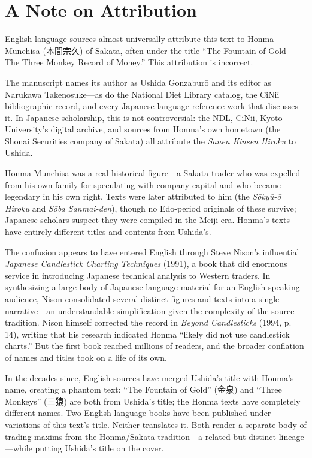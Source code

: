 \documentclass[10pt, openany]{book}
\newcommand{\jp}[1]{{\japanesefont #1}}
\begin{document}
\section*{A Note on Attribution}

English-language sources almost universally attribute this text to Honma
Munehisa (\jp{本間宗久}) of Sakata, often under the title ``The Fountain
of Gold---The Three Monkey Record of Money.'' This attribution is
incorrect.

The manuscript names its author as Ushida Gonzabur\=o and its editor as
Narukawa Takenosuke---as do the National Diet Library catalog, the CiNii
bibliographic record, and every Japanese-language reference work that
discusses it. In Japanese scholarship, this is not controversial:
the NDL, CiNii, Kyoto University's digital archive, and sources from
Honma's own hometown (the Shonai Securities company of Sakata) all
attribute the \textit{Sanen Kinsen Hiroku} to Ushida.

Honma Munehisa was a real historical figure---a Sakata trader who was
expelled from his own family for speculating with company capital and who
became legendary in his own right. Texts were later attributed to him
(the \textit{S\=oky\=u-\=o Hiroku} and \textit{S\=oba Sanmai-den}),
though no Edo-period originals of these survive; Japanese scholars suspect
they were compiled in the Meiji era. Honma's texts have entirely different
titles and contents from Ushida's.

The confusion appears to have entered English through Steve Nison's
influential \textit{Japanese Candlestick Charting Techniques} (1991),
a book that did enormous service in introducing Japanese technical
analysis to Western traders. In synthesizing a large body of
Japanese-language material for an English-speaking audience, Nison
consolidated several distinct figures and texts into a single
narrative---an understandable simplification given the complexity of the
source tradition. Nison himself corrected the record in
\textit{Beyond Candlesticks} (1994, p.\,14), writing that his research
indicated Honma ``likely did not use candlestick charts.'' But the first
book reached millions of readers, and the broader conflation of names
and titles took on a life of its own.

In the decades since, English sources have merged Ushida's title with
Honma's name, creating a phantom text: ``The Fountain of Gold'' (\jp{金泉})
and ``Three Monkeys'' (\jp{三猿}) are both from Ushida's title; the Honma
texts have completely different names. Two English-language books have been
published under variations of this text's title. Neither translates it.
Both render a separate body of trading maxims from the Honma/Sakata
tradition---a related but distinct lineage---while putting Ushida's title
on the cover.
\end{document}
